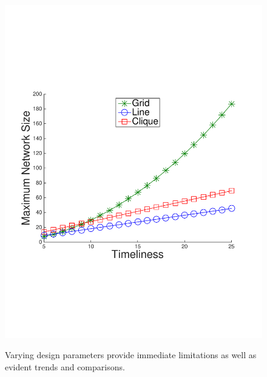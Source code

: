 \begin{figure}
{	\includegraphics[scale=0.22, clip=true, trim=14mm 65mm 25mm 65mm]{figures/use_cases_examples/cluster/num_nodes_vs_tness_cluster_color.pdf}
        \label{fig:use_case_num_nodes_vs_qoi_2}
        }
   \vspace{-1mm}
   \caption{Varying design parameters provide immediate limitations as well as evident trends and comparisons.}
   \label{fig:huh_net_design}
   \vspace{-6mm}
\end{figure}
